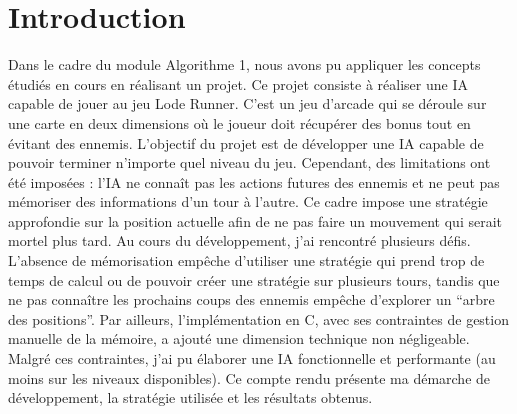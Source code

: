 \chapter{Introduction}
\label{cp:introduction}
Dans le cadre du module Algorithme 1, nous avons pu appliquer les concepts étudiés en cours en réalisant un projet. Ce projet consiste à réaliser une IA capable de jouer au jeu Lode Runner. C'est un jeu d'arcade qui se déroule sur une carte en deux dimensions où le joueur doit récupérer des bonus tout en évitant des ennemis. 
\newline\newline
L'objectif du projet est de développer une IA capable de pouvoir terminer n'importe quel niveau du jeu. Cependant, des limitations ont été imposées : l'IA ne connaît pas les actions futures des ennemis et ne peut pas mémoriser des informations d'un tour à l'autre. Ce cadre impose une stratégie approfondie sur la position actuelle afin de ne pas faire un mouvement qui serait mortel plus tard.
\newline\newline
Au cours du développement, j'ai rencontré plusieurs défis. L'absence de mémorisation empêche d'utiliser une stratégie qui prend trop de temps de calcul ou de pouvoir créer une stratégie sur plusieurs tours, tandis que ne pas connaître les prochains coups des ennemis empêche d'explorer un “arbre des positions”. Par ailleurs, l'implémentation en C, avec ses contraintes de gestion manuelle de la mémoire, a ajouté une dimension technique non négligeable.
\newline\newline
Malgré ces contraintes, j'ai pu élaborer une IA fonctionnelle et performante (au moins sur les niveaux disponibles).
\newline\newline
Ce compte rendu présente ma démarche de développement, la stratégie utilisée et les résultats obtenus.